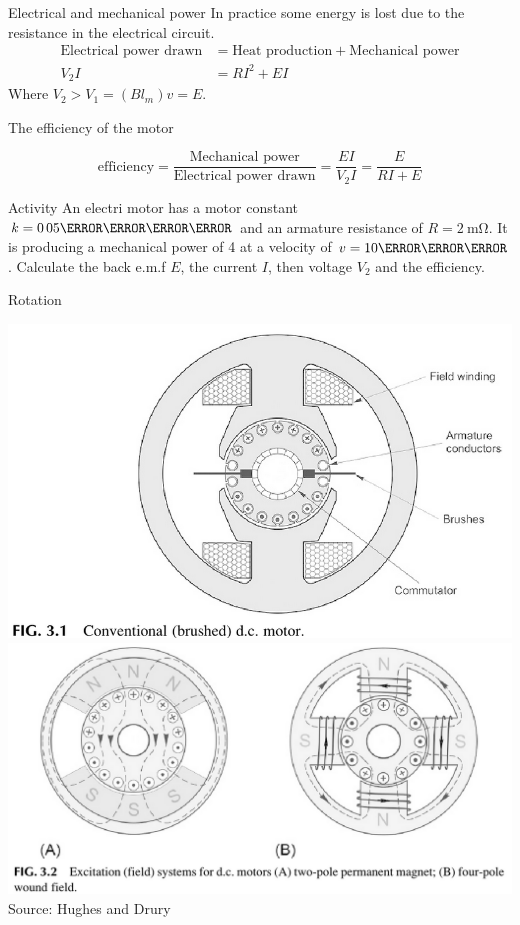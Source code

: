 \documentclass[presentation,aspectratio=169]{beamer}
\begin{document}
\begin{frame}[label={sec:org6bcdbea}]{Electrical and mechanical power}
In practice some energy is lost due to the resistance in the electrical circuit.
\begin{align*}
\text{Electrical power drawn} &= \text{Heat production} + \text{Mechanical power}\\
V_2 I &= RI^2 + EI
\end{align*}
Where \(V_2 > V_1 = (Bl_m)v = E\).

The efficiency of the motor

\[ \text{efficiency} = \frac{\text{Mechanical power}}{\text{Electrical power drawn}} = \frac{EI}{V_2I} = \frac{E}{RI + E}\]

\alert{Activity} An electri motor has a motor constant \(k=\unit{0.05}{\kilo\newton\per\ampere}\) and an armature resistance  of \(R=\SI{2}{\milli\ohm}\). It is producing a mechanical power of \unit{4}{\mega\watt} at a velocity of \(v=\unit{10}{\meter\per\second}\). Calculate the back e.m.f \(E\), the current \(I\), then voltage \(V_2\) and the efficiency.
\end{frame}

\begin{frame}[label={sec:orgfedfd90}]{Rotation}
\begin{center}
\includegraphics[width=0.4\linewidth]{../../figures/HD-fig3_1.png}
\includegraphics[width=0.53\linewidth]{../../figures/HD-fig3_2.png}
{\footnotesize Source: Hughes and Drury}
\end{center}
\end{frame}
\end{document}
